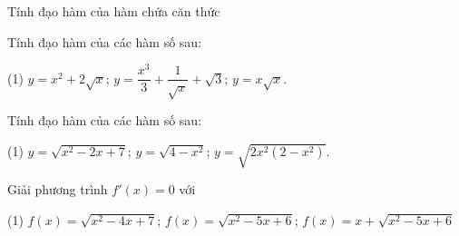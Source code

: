 \begin{dang}{Tính đạo hàm của hàm chứa căn thức}
\end{dang}

\begin{vd}
	Tính đạo hàm của các hàm số sau:
	\begin{tasks}(1)
		\task $y=x^2+2\sqrt{x}$;
		\task $y=\dfrac{x^3}{3}+\dfrac{1}{\sqrt{x}}+\sqrt{3}$;
		\task $y=x\sqrt{x}$.
	\end{tasks}
\end{vd} 

\begin{vd}
	Tính đạo hàm của các hàm số sau:
	\begin{tasks}(1)
		\task $y=\sqrt{x^2-2x+7}$;
		\task $y=\sqrt{4-x^2}$;
		\task $y=\sqrt{2x^2(2-x^2)}$.
	\end{tasks}
\end{vd} 

\begin{vd}
	Giải phương trình $f'(x)=0$ với
	\begin{tasks}(1)
		\task $f(x)=\sqrt{x^2-4x+7}$;
		\task $f(x)=\sqrt{x^2-5x+6}$;
		\task $f(x)=x+\sqrt{x^2-5x+6}$
	\end{tasks}
\end{vd} 

